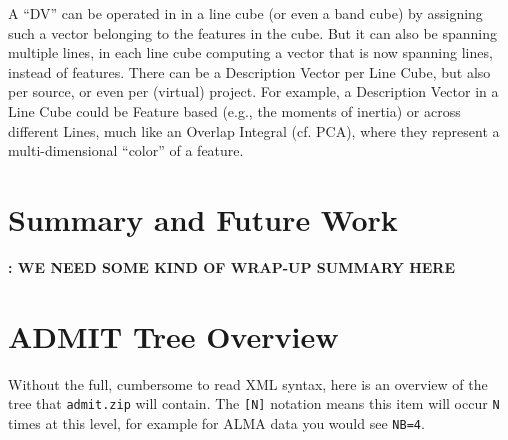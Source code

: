 \documentclass{article}
\begin{document}
A ``DV'' can be operated in in a line cube (or even a band cube) by
assigning such a vector belonging to the features in the cube. But
it can also be spanning multiple lines, in each line cube computing a
vector that is now spanning lines, instead of features.  There can be a
Description Vector per Line Cube, but also per source, or even per (virtual)
project. For example, a Description Vector in a Line Cube could be Feature
based (e.g., the moments of inertia) or across different Lines, much like
an Overlap Integral (cf. PCA), where they represent a multi-dimensional
``color'' of a feature.

\section{Summary and Future Work}

{\bf: WE NEED SOME KIND OF WRAP-UP SUMMARY HERE}

%
%
%
%
%
%
%


\appendix

\section{ADMIT Tree Overview}
Without the full, cumbersome to read XML syntax, here is an overview of
the tree that {\tt admit.zip} will contain.  The {\tt [N]} notation
means this item will occur {\tt N} times at this level, for example for
ALMA data you would see {\tt NB=4}.
\end{document}
